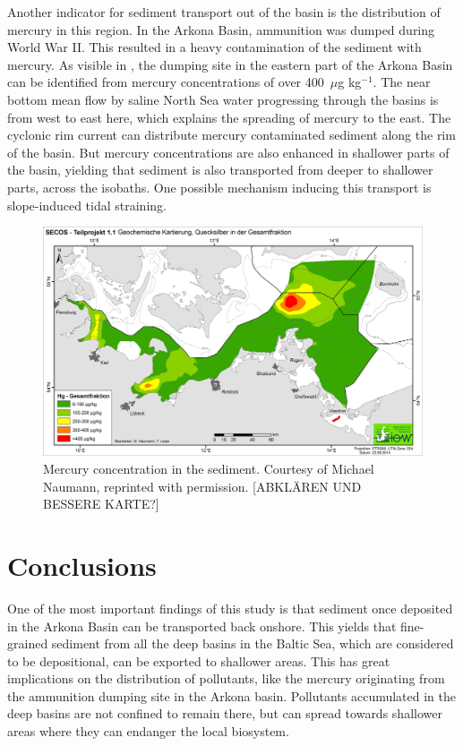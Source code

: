 Another indicator for sediment transport out of the basin is the distribution 
of mercury in this region. In the Arkona Basin, ammunition was dumped during 
World War II. This resulted in a heavy contamination of the sediment with 
mercury. As visible in , the dumping site in the eastern part of the 
Arkona Basin can be identified from mercury concentrations of over 400~$\mu$g 
kg$^{-1}$. The near bottom mean flow by saline North Sea water progressing 
through the basins is from west to east here, which explains the spreading of 
mercury to the east. The cyclonic rim current can distribute mercury 
contaminated sediment along the rim of the basin. But mercury concentrations 
are also enhanced in shallower parts of the basin, yielding that sediment is 
also transported from deeper to shallower parts, across the isobaths. One 
possible mechanism inducing this transport is slope-induced tidal straining.
   \begin{figure}[ht]
\includegraphics[width=15cm]{bilder/HG_GF.jpg}
 \caption{Mercury concentration in the sediment. Courtesy of Michael Naumann, 
reprinted with permission. [ABKLÄREN UND BESSERE KARTE?]}
 \label{hg}
 \end{figure}
 
\section{Conclusions}

One of the most important findings of this study is that sediment once 
deposited in the Arkona Basin can be transported back onshore. 
This yields that fine-grained sediment from all the deep basins in the Baltic 
Sea, which are considered to be depositional, can be exported to 
shallower areas. This has great implications on the distribution of pollutants, 
like the mercury originating from the ammunition dumping site in the Arkona 
basin. Pollutants accumulated in the deep basins are not confined to remain 
there, but can spread towards shallower areas where they can endanger the local 
biosystem.

